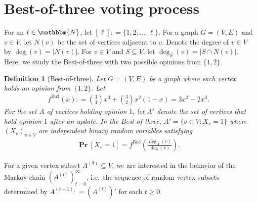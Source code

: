 \documentclass[letterpaper,11pt]{article}
\newtheorem{definition}[theorem]{Definition}
\newcommand{\Bthree}{\mathrm{Bo3}}
\renewcommand\Pr{\mathop{\mathbf{Pr}}}
\def\defeq{\mathrel{\mathop:}=}%
\begin{document}
%
\section{Best-of-three voting process}\label{sec:preliminaries}
For an $\ell\in \mathbbm{N}$, let $[\ell]\defeq \{1,2,\ldots, \ell\}$.
For a graph $G=(V,E)$ and $v\in V$, 
let $N(v)$ be the set of vertices adjacent to $v$.
Denote the degree of $v\in V$ by $\deg(v)=|N(v)|$.
For $v\in V$ and $S\subseteq V$, let $\deg_S(v)=|S\cap N(v)|$.
Here, we study the Best-of-three with two possible opinions from $\{1,2\}$.
\begin{definition}[Best-of-three]
Let $G=(V,E)$ be a graph where each vertex holds an opinion from~$\{1,2\}$.
Let 
\begin{align*}
f^{\Bthree}(x)\defeq \binom{3}{3}x^3+\binom{3}{2}x^2(1-x)=3x^2-2x^3.
\end{align*}
For the set $A$ of vertices holding opinion $1$,
let $A'$ denote the set of vertices that hold opinion $1$ after an update.
In the Best-of-three, $A'= \{v\in V: X_v=1\}$ where $(X_v)_{v\in V}$ are independent binary random variables satisfying 
\begin{align*}
\Pr[X_v=1]=
f^{\Bthree}\left(\frac{\deg_A(v)}{\deg(v)}\right).
\end{align*}
\end{definition}
For a given vertex subset $A^{(0)}\subseteq V$, 
we are interested in the behavior of the Markov chain $(A^{(t)})_{t=0}^{\infty}$, i.e.~the sequence of random vertex subsets determined by $A^{(t+1)}\defeq (A^{(t)})'$ for each $t\geq 0$.
\end{document}
